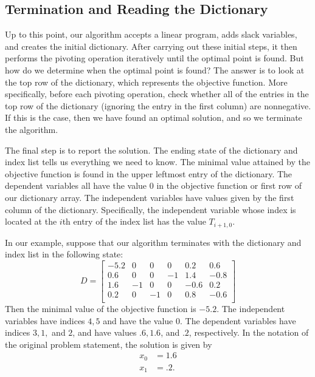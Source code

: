 \vspace{2mm}

\subsection*{Termination and Reading the Dictionary} %

Up to this point, our algorithm accepts a linear program, adds slack variables, and creates the initial dictionary.
After carrying out these initial steps, it then performs the pivoting operation iteratively until the optimal point is found.
But how do we determine when the optimal point is found? The answer is to look at the top row of the dictionary, which represents the objective function.
More specifically, before each pivoting operation, check whether all of the entries in the top row of the dictionary (ignoring the entry in the first column) are nonnegative.
If this is the case, then we have found an optimal solution, and so we terminate the algorithm.

The final step is to report the solution.
The ending state of the dictionary and index list tells us everything we need to know.
The minimal value attained by the objective function is found in the upper leftmost entry of the dictionary.
The dependent variables all have the value $0$ in the objective function or first row of our dictionary array. The independent variables have values given by the first column of the dictionary.
Specifically, the independent variable whose index is located at the $i$th entry of the index list has the value $T_{i+1, 0}$.

In our example, suppose that our algorithm terminates with the dictionary and index list in the following state:
\[
D = \begin{bmatrix}
-5.2 & 0 & 0 & 0 & 0.2 & 0.6\\
0.6 & 0 & 0 & -1 & 1.4 & -0.8\\
1.6 & -1 & 0 & 0 & -0.6 & 0.2\\
0.2 & 0 & -1 & 0 & 0.8 & -0.6\\
\end{bmatrix}
\]
Then the minimal value of the objective function is $-5.2$.
The independent variables have indices $4, 5$ and have the value $0$.
The dependent variables have indices $3, 1,$ and $2$, and have values $.6, 1.6$, and $.2$, respectively.
In the notation of the original problem statement, the solution is given by
\begin{align*}
x_0 &= 1.6\\
x_1 &= .2.
\end{align*}

